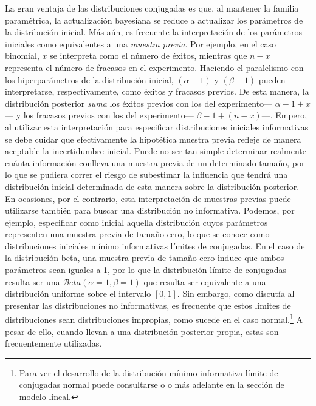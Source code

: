 {La gran ventaja de las distribuciones conjugadas es que, al mantener la familia paramétrica, la actualización bayesiana se reduce a actualizar los parámetros de la distribución inicial. Más aún, es frecuente la interpretación de los parámetros iniciales como equivalentes a una \textit{muestra previa}. Por ejemplo, en el caso binomial, $x$ se interpreta como el número de éxitos, mientras que $n-x$ representa el número de fracasos en el experimento. Haciendo el paralelismo con los hiperparámetros de la distribución inicial, $(\alpha-1)$ y $(\beta-1)$ pueden interpretarse, respectivamente, como éxitos y fracasos previos. De esta manera, la distribución posterior \textit{suma} los éxitos previos con los del experimento--- $\alpha -1 + x$--- y los fracasos previos con los del experimento--- $\beta -1 + (n-x)$---. Empero, al utilizar esta interpretación para especificar distribuciones iniciales informativas se debe cuidar que efectivamente la hipotética muestra previa refleje de manera aceptable la incertidumbre inicial. Puede no ser tan simple determinar realmente cuánta información conlleva una muestra previa de un determinado tamaño, por lo que se pudiera correr el riesgo de subestimar la influencia que tendrá una distribución inicial determinada de esta manera sobre la distribución posterior.\\ 

En ocasiones, por el contrario, esta interpretación de muestras previas puede utilizarse también para buscar una distribución no informativa. Podemos, por ejemplo, especificar como inicial aquella distribución cuyos parámetros representen una muestra previa de tamaño cero, lo que se conoce como distribuciones iniciales mínimo informativas límites de conjugadas. En el caso de la distribución beta, una muestra previa de tamaño cero induce que ambos parámetros sean iguales a 1, por lo que la distribución límite de conjugadas resulta ser una $\mathcal{B}eta(\alpha = 1, \beta = 1)$ que resulta ser equivalente a una distribución uniforme sobre el intervalo $[0,1]$. Sin embargo, como discutía al presentar las distribuciones no informativas, es frecuente que estos límites de distribuciones sean distribuciones impropias, como sucede en el caso normal.\footnote{Para ver el desarrollo de la distribución mínimo informativa límite de conjugadas normal puede consultarse \textcite[79-80]{Mendoza11} o {\color{Red} o más adelante en la sección de modelo lineal.}} A pesar de ello, cuando llevan a una distribución posterior propia, estas son frecuentemente utilizadas.\\

}
